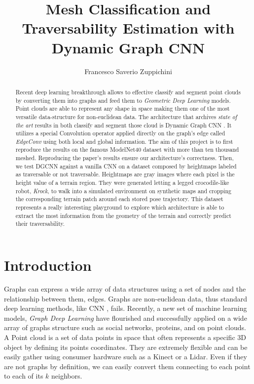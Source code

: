 \documentclass[twocolumn,showpacs,
  nofootinbib,aps,superscriptaddress,
  eqsecnum,prd,notitlepage,showkeys,10pt]{revtex4-1}
\begin{document}
\title{Mesh Classification and Traversability Estimation with Dynamic Graph CNN}
\author{Francesco Saverio Zuppichini}
\begin{abstract}
  Recent deep learning breakthrough allows to effective classify and segment point clouds by converting them into graphs and feed them to \emph{Geometric Deep Learning} models. Point clouds are able to represent any shape in space making them one of the most versatile data-structure for non-euclidean data. The architecture that archives \emph{state of the art} results in both classify and segment those cloud is Dynamic Graph CNN \cite{dgcnn}. It utilizes a special Convolution operator applied directly on the graph's edge called \emph{EdgeConv} using both local and global information. The aim of this project is to first reproduce the results on the famous ModelNet40 \cite{shapenet} dataset with more than ten thousand meshed. Reproducing the paper's results ensure our architecture's correctness.
  Then, we test DGCNN against a vanilla CNN on a dataset composed by heightmaps labeled as traversable or not traversable. Heightmaps are gray images where each pixel is the height value of a terrain region. They were generated letting a legged crocodile-like robot, \emph{Krock}, to walk into a simulated environment on synthetic maps and cropping the corresponding terrain patch around each stored pose trajectory. This dataset represents a really interesting playground to explore which architecture is able to extract the most information from the geometry of the terrain and correctly predict their traversability. 
\end{abstract}
\maketitle
\section{Introduction}

Graphs can express a wide array of data structures using a set of nodes and the relationship between them, edges. Graphs are non-euclidean data, thus standard deep learning methods, like CNN \cite{cnn}, fails. Recently, a new set of machine learning models, \emph{Graph Deep Learning} have flourished and successfully applied on a wide array of graphs structure such as social networks, proteins, and on point clouds. A Point cloud is a set of data points in space that often represents a specific 3D object by defining its points coordinates. They are extremely flexible and can be easily gather using consumer hardware such as a Kinect or a Lidar. Even if they are not graphs by definition, we can easily convert them connecting to each point to each of its $k$ neighbors.
\end{document}
